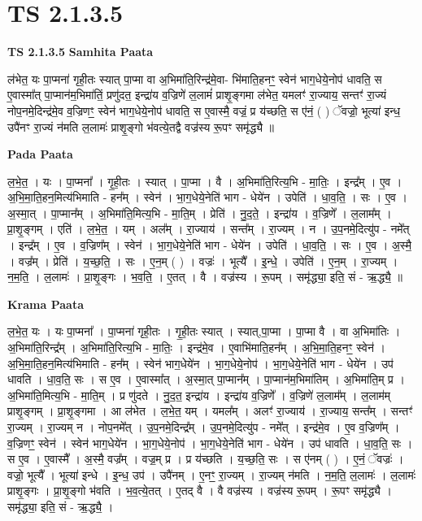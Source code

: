 \documentclass[17pt]{extarticle}
\begin{document}
\section*{ TS 2.1.3.5 }

\textbf{TS 2.1.3.5 } \newline
\textbf{Samhita Paata} \newline

ल॑भेत॒ यः पा॒प्मना॑ गृही॒तः स्यात् पा॒प्मा वा अ॒भिमा॑ति॒रिन्द्र॑मे॒वा- भि॑माति॒हनꣳ॒॒ स्वेन॑ भाग॒धेये॒नोप॑ धावति॒ स ए॒वास्मा᳚त् पा॒प्मान॑म॒भिमा॑तिं॒ प्रणु॑दत॒ इन्द्रा॑य व॒ज्रिणे॑ ल॒लामं॑ प्राशृ॒ङ्गमा ल॑भेत॒ यमलꣳ॑ रा॒ज्याय॒ सन्तꣳ॑ रा॒ज्यं नोप॒नमे॒दिन्द्र॑मे॒व व॒ज्रिणꣳ॒॒ स्वेन॑ भाग॒धेये॒नोप॑ धावति॒ स ए॒वास्मै॒ वज्रं॒ प्र य॑च्छति॒ स ए॑नं॒ ( ) ॅवज्रो॒ भूत्या॑ इन्ध॒ उपै॑नꣳ रा॒ज्यं न॑मति ल॒लामः॑ प्राशृ॒ङ्गो भ॑वत्ये॒तद्वै वज्र॑स्य रू॒पꣳ समृ॑द्ध्यै ॥ \newline

\textbf{Pada Paata} \newline

ल॒भे॒त॒ । यः । पा॒प्मना᳚ । गृ॒ही॒तः । स्यात् । पा॒प्मा । वै । अ॒भिमा॑ति॒रित्य॒भि - मा॒तिः॒ । इन्द्र᳚म् । ए॒व । अ॒भि॒मा॒ति॒हन॒मित्य॑भिमाति - हन᳚म् । स्वेन॑ । भा॒ग॒धेये॒नेति॑ भाग - धेये॑न । उपेति॑ । धा॒व॒ति॒ । सः । ए॒व । अ॒स्मा॒त् । पा॒प्मान᳚म् । अ॒भिमा॑ति॒मित्य॒भि - मा॒ति॒म् । प्रेति॑ । नु॒द॒ते॒ । इन्द्रा॑य । व॒ज्रिणे᳚ । ल॒लाम᳚म् । प्रा॒शृ॒ङ्गम् । एति॑ । ल॒भे॒त॒ । यम् । अल᳚म् । रा॒ज्याय॑ । सन्त᳚म् । रा॒ज्यम् । न । उ॒प॒नमे॒दित्यु॑प - नमे᳚त् । इन्द्र᳚म् । ए॒व । व॒ज्रिण᳚म् । स्वेन॑ । भा॒ग॒धेये॒नेति॑ भाग - धेये॑न । उपेति॑ । धा॒व॒ति॒ । सः । ए॒व । अ॒स्मै॒ । वज्र᳚म् । प्रेति॑ । य॒च्छ॒ति॒ । सः । ए॒न॒म् ( ) । वज्रः॑ । भूत्यै᳚ । इ॒न्धे॒ । उपेति॑ । ए॒न॒म् । रा॒ज्यम् । न॒म॒ति॒ । ल॒लामः॑ । प्रा॒शृ॒ङ्गः । भ॒व॒ति॒ । ए॒तत् । वै । वज्र॑स्य । रू॒पम् । समृ॑द्ध्या॒ इति॒ सं - ऋ॒द्ध्यै॒ ॥  \newline


\textbf{Krama Paata} \newline

ल॒भे॒त॒ यः । यः पा॒प्मना᳚ । पा॒प्मना॑ गृही॒तः । गृ॒ही॒तः स्यात् । स्यात्,पा॒प्मा । पा॒प्मा वै । वा अ॒भिमा॑तिः । अ॒भिमा॑ति॒रिन्द्र᳚म् । अ॒भिमा॑ति॒रित्य॒भि - मा॒तिः॒ । इन्द्र॑मे॒व । ए॒वाभि॑माति॒हन᳚म् । अ॒भि॒मा॒ति॒हनꣳ॒॒ स्वेन॑ । अ॒भि॒मा॒ति॒हन॒मित्य॑भिमाति - हन᳚म् । स्वेन॑ भाग॒धेये॑न । भा॒ग॒धेये॒नोप॑ । भा॒ग॒धेये॒नेति॑ भाग - धेये॑न । उप॑ धावति । धा॒व॒ति॒ सः । स ए॒व । ए॒वास्मा᳚त् । अ॒स्मा॒त् पा॒प्मान᳚म् । पा॒प्मान॑म॒भिमा॑तिम् । अ॒भिमा॑ति॒म् प्र । अ॒भिमा॑ति॒मित्य॒भि - मा॒ति॒म् । प्र णु॑दते । नु॒द॒त॒ इन्द्रा॑य । इन्द्रा॑य व॒ज्रिणे᳚ । व॒ज्रिणे॑ ल॒लाम᳚म् । ल॒लाम॑म् प्राशृ॒ङ्गम् । प्रा॒शृ॒ङ्गमा । आ ल॑भेत । ल॒भे॒त॒ यम् । यमल᳚म् । अलꣳ॑ रा॒ज्याय॑ । रा॒ज्याय॒ सन्त᳚म् । सन्तꣳ॑ रा॒ज्यम् । रा॒ज्यम् न । नोप॒नमे᳚त् । उ॒प॒नमे॒दिन्द्र᳚म् । उ॒प॒नमे॒दित्यु॑प - नमे᳚त् । इन्द्र॑मे॒व । ए॒व व॒ज्रिण᳚म् । व॒ज्रिणꣳ॒॒ स्वेन॑ । स्वेन॑ भाग॒धेये॑न । भा॒ग॒धेये॒नोप॑ । भा॒ग॒धेये॒नेति॑ भाग - धेये॑न । उप॑ धावति । धा॒व॒ति॒ सः । स ए॒व । ए॒वास्मै᳚ । अ॒स्मै॒ वज्र᳚म् । वज्र॒म् प्र । प्र य॑च्छति । य॒च्छ॒ति॒ सः । स ए॑नम् ( ) । ए॒नं॒ ॅवज्रः॑ । वज्रो॒ भूत्यै᳚ । भूत्या॑ इन्धे । इ॒न्ध॒ उप॑ । उपै॑नम् । ए॒नꣳ॒॒ रा॒ज्यम् । रा॒ज्यम् न॑मति । न॒म॒ति॒ ल॒लामः॑ । ल॒लामः॑ प्राशृ॒ङ्गः । प्रा॒शृ॒ङ्गो भ॑वति । भ॒व॒त्ये॒तत् । ए॒तद् वै । वै वज्र॑स्य । वज्र॑स्य रू॒पम् । रू॒पꣳ समृ॑द्ध्यै । समृ॑द्ध्या॒ इति॒ सं - ऋ॒द्ध्यै॒ । \newline
\end{document}
